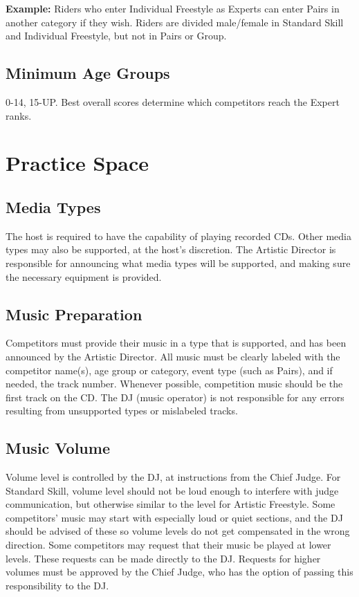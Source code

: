 \textbf{Example:} Riders who enter Individual Freestyle as Experts can enter Pairs in another category if they wish.
Riders are divided male/female in Standard Skill and Individual Freestyle, but not in Pairs or Group.

\subsection{Minimum Age Groups}

0-14, 15-UP.
Best overall scores determine which competitors reach the Expert ranks.

\section{Practice Space}

\subsection{Media Types}
The host is required to have the capability of playing recorded CDs.
Other media types may also be supported, at the host's discretion.
The Artistic Director is responsible for announcing what media types will be supported, and making sure the necessary equipment is provided.

\subsection{Music Preparation}
Competitors must provide their music in a type that is supported, and has been announced by the Artistic Director.
All music must be clearly labeled with the competitor name(s), age group or category, event type (such as Pairs), and if needed, the track number.
Whenever possible, competition music should be the first track on the CD.
The DJ (music operator) is not responsible for any errors resulting from unsupported types or mislabeled tracks.

\subsection{Music Volume}
Volume level is controlled by the DJ, at instructions from the Chief Judge.
For Standard Skill, volume level should not be loud enough to interfere with judge communication, but otherwise similar to the level for Artistic Freestyle.
Some competitors' music may start with especially loud or quiet sections, and the DJ should be advised of these so volume levels do not get compensated in the wrong direction.
Some competitors may request that their music be played at lower levels.
These requests can be made directly to the DJ.
Requests for higher volumes must be approved by the Chief Judge, who has the option of passing this responsibility to the DJ.

